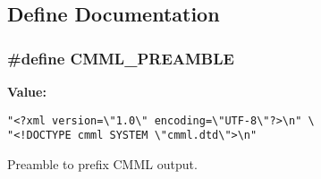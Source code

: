 \subsection{Define Documentation}
\subsubsection{\setlength{\rightskip}{0pt plus 5cm}\#define CMML\_\-PREAMBLE}\label{anxrip__no__libcmml_8c_a0}


{\bf Value:}

\footnotesize\begin{verbatim}"<?xml version=\"1.0\" encoding=\"UTF-8\"?>\n" \
"<!DOCTYPE cmml SYSTEM \"cmml.dtd\">\n"
\end{verbatim}\normalsize 
Preamble to prefix CMML output. 

